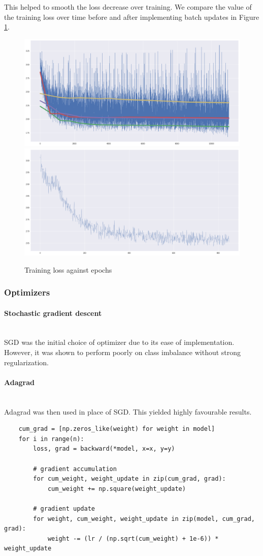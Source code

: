 \documentclass{article}
\numberwithin{equation}{section}
\begin{document}
This helped to smooth the loss decrease over training. We compare the value of the training loss over time before and after implementing batch updates in Figure \ref{fig:batch-updates}.

\begin{figure}[h]
	\centering
	\includegraphics[width=0.45\linewidth]{assets/loss_nobatch.png}
	\includegraphics[width=0.45\linewidth]{assets/loss_batch.png}
	\caption{Training loss against epochs}
	\label{fig:batch-updates}	
\end{figure}

\subsubsection{Optimizers}
\paragraph{Stochastic gradient descent}\mbox{}\\
SGD was the initial choice of optimizer due to its ease of implementation. However, it was shown to perform poorly on class imbalance without strong regularization.

\paragraph{Adagrad}\mbox{}\\
Adagrad was then used in place of SGD. This yielded highly favourable results.

\begin{verbatim}
    cum_grad = [np.zeros_like(weight) for weight in model]
    for i in range(n):
        loss, grad = backward(*model, x=x, y=y)

        # gradient accumulation
        for cum_weight, weight_update in zip(cum_grad, grad):
            cum_weight += np.square(weight_update)

        # gradient update
        for weight, cum_weight, weight_update in zip(model, cum_grad, grad):
            weight -= (lr / (np.sqrt(cum_weight) + 1e-6)) * weight_update
\end{verbatim}
\end{document}

